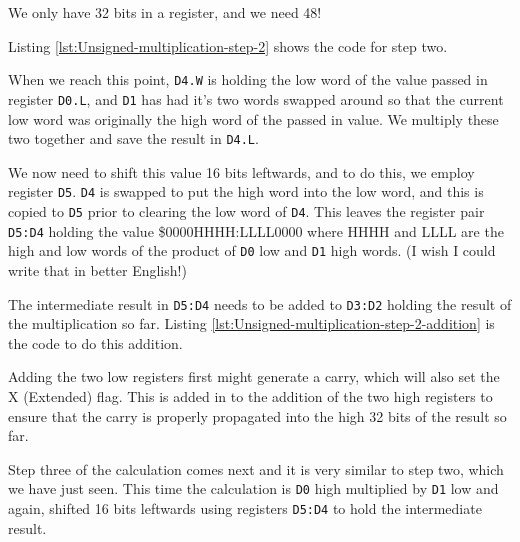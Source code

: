 We only have 32 bits in a register, and we need 48!

Listing \ref{lst:Unsigned-multiplication-step-2} shows the code for
step two.



When we reach this point, \texttt{D4.W} is holding the low word of
the value passed in register \texttt{D0.L}, and \texttt{D1} has had
it's two words swapped around so that the current low word was originally
the high word of the passed in value. We multiply these two together
and save the result in \texttt{D4.L}.

We now need to shift this value 16 bits leftwards, and to do this,
we employ register \texttt{D5}. \texttt{D4} is swapped to put the
high word into the low word, and this is copied to \texttt{D5} prior
to clearing the low word of \texttt{D4}. This leaves the register
pair \texttt{D5:D4} holding the value \$0000HHHH:LLLL0000 where HHHH
and LLLL are the high and low words of the product of \texttt{D0}
low and \texttt{D1} high words. (I wish I could write that in better
English!)

The intermediate result in \texttt{D5:D4} needs to be added to \texttt{D3:D2}
holding the result of the multiplication so far. Listing \ref{lst:Unsigned-multiplication-step-2-addition}
is the code to do this addition.



Adding the two low registers first might generate a carry, which will
also set the X (Extended) flag. This is added in to the addition of
the two high registers to ensure that the carry is properly propagated
into the high 32 bits of the result so far.

Step three of the calculation comes next and it is very similar to
step two, which we have just seen. This time the calculation is \texttt{D0}
high multiplied by \texttt{D1} low and again, shifted 16 bits leftwards
using registers \texttt{D5:D4} to hold the intermediate result.



